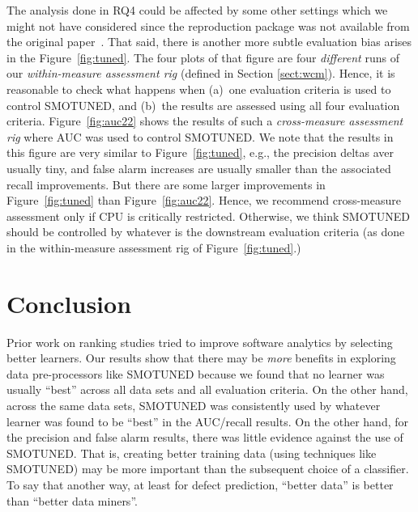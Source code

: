 \documentclass[sigconf]{acmart}
\theoremstyle{break}
\newcommand{\tion}[1]{{Section }\ref{sect:#1}}
\newcommand{\smb}{{\sc SMOTUNED}}
\begin{document}
The analysis done in RQ4 could be affected by some other settings which we might not have considered since the reproduction package was not available from the original paper~\cite{bennin2017mahakil}.
That said, there is another more subtle evaluation bias arises in the Figure~\ref{fig:tuned}. The four plots of that figure are four {\em different} runs of our  {\em within-measure assessment rig}
(defined in \tion{wcm}). Hence, it is reasonable to check what happens when (a)~one
evaluation criteria is used to control {\smb}, and (b)~the results are assessed
using all four evaluation criteria. 
Figure~\ref{fig:auc22} shows the results of such a {\em cross-measure assessment rig} where AUC was used to control {\smb}. We note that the results in this figure are very similar to Figure~\ref{fig:tuned}, e.g., the precision deltas aver usually tiny, and false alarm increases are usually smaller than the associated recall improvements. But there are some larger improvements in Figure~\ref{fig:tuned}
than Figure~\ref{fig:auc22}. Hence, we recommend cross-measure assessment only if CPU is critically restricted. Otherwise, we think {\smb} should be controlled by whatever is the downstream evaluation criteria
(as done in the within-measure assessment rig of Figure~\ref{fig:tuned}.)



\section{Conclusion}
\label{sect:conclusion}





Prior work on ranking studies tried to improve software analytics by selecting better learners.
Our results show that there may be {\em more} benefits in exploring data pre-processors like {\smb} because we found  that no  learner  was  usually  
``best''  
across all  data  sets  and  all  evaluation  criteria. On the other hand, across the same data sets,
{\smb} was  consistently  used  by  whatever  learner  was  found  to  be ``best'' in the  AUC/recall results. On the other hand, for the precision and false alarm results, there was little evidence against the use of {\smb}. That is, creating better training data  (using techniques like {\smb}) may be  more important than  the  subsequent  choice  of a classifier. To say that another way, at least for defect prediction, ``better data'' is  better than ``better
data miners''.
\end{document}
